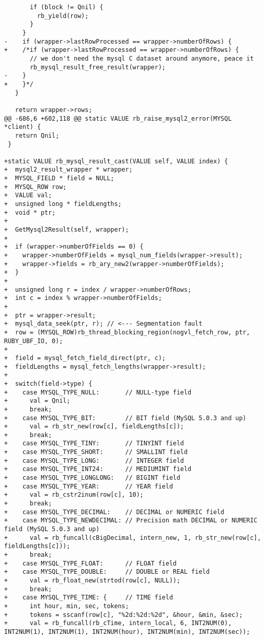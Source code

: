 \begin{lstlisting}
       if (block != Qnil) {
         rb_yield(row);
       }
     }
-    if (wrapper->lastRowProcessed == wrapper->numberOfRows) {
+    /*if (wrapper->lastRowProcessed == wrapper->numberOfRows) {
       // we don't need the mysql C dataset around anymore, peace it
       rb_mysql_result_free_result(wrapper);
-    }
+    }*/
   }
 
   return wrapper->rows;
@@ -686,6 +602,118 @@ static VALUE rb_raise_mysql2_error(MYSQL *client) {
   return Qnil;
 }
 
+static VALUE rb_mysql_result_cast(VALUE self, VALUE index) {
+  mysql2_result_wrapper * wrapper;
+  MYSQL_FIELD * field = NULL;
+  MYSQL_ROW row;
+  VALUE val;
+  unsigned long * fieldLengths;
+  void * ptr;
+  
+  GetMysql2Result(self, wrapper);
+  
+  if (wrapper->numberOfFields == 0) {
+    wrapper->numberOfFields = mysql_num_fields(wrapper->result);
+    wrapper->fields = rb_ary_new2(wrapper->numberOfFields);
+  }
+  
+  unsigned long r = index / wrapper->numberOfRows;
+  int c = index % wrapper->numberOfFields;
+  
+  ptr = wrapper->result;
+  mysql_data_seek(ptr, r); // <--- Segmentation fault
+  row = (MYSQL_ROW)rb_thread_blocking_region(nogvl_fetch_row, ptr, RUBY_UBF_IO, 0);
+  
+  field = mysql_fetch_field_direct(ptr, c);
+  fieldLengths = mysql_fetch_lengths(wrapper->result);
+  
+  switch(field->type) {
+    case MYSQL_TYPE_NULL:       // NULL-type field
+      val = Qnil;
+      break;
+    case MYSQL_TYPE_BIT:        // BIT field (MySQL 5.0.3 and up)
+      val = rb_str_new(row[c], fieldLengths[c]);
+      break;
+    case MYSQL_TYPE_TINY:       // TINYINT field
+    case MYSQL_TYPE_SHORT:      // SMALLINT field
+    case MYSQL_TYPE_LONG:       // INTEGER field
+    case MYSQL_TYPE_INT24:      // MEDIUMINT field
+    case MYSQL_TYPE_LONGLONG:   // BIGINT field
+    case MYSQL_TYPE_YEAR:       // YEAR field
+      val = rb_cstr2inum(row[c], 10);
+      break;
+    case MYSQL_TYPE_DECIMAL:    // DECIMAL or NUMERIC field
+    case MYSQL_TYPE_NEWDECIMAL: // Precision math DECIMAL or NUMERIC field (MySQL 5.0.3 and up)
+      val = rb_funcall(cBigDecimal, intern_new, 1, rb_str_new(row[c], fieldLengths[c]));
+      break;
+    case MYSQL_TYPE_FLOAT:      // FLOAT field
+    case MYSQL_TYPE_DOUBLE:     // DOUBLE or REAL field
+      val = rb_float_new(strtod(row[c], NULL));
+      break;
+    case MYSQL_TYPE_TIME: {     // TIME field
+      int hour, min, sec, tokens;
+      tokens = sscanf(row[c], "%2d:%2d:%2d", &hour, &min, &sec);
+      val = rb_funcall(rb_cTime, intern_local, 6, INT2NUM(0), INT2NUM(1), INT2NUM(1), INT2NUM(hour), INT2NUM(min), INT2NUM(sec));

\end{lstlisting}
